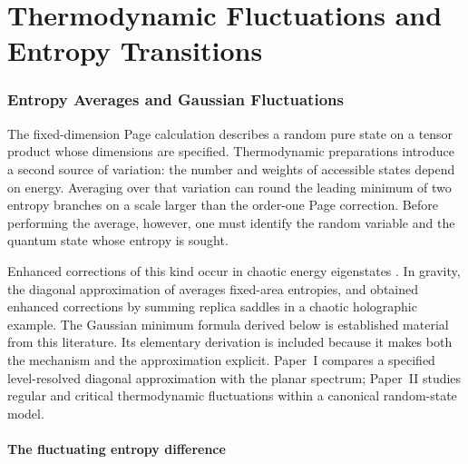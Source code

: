 \documentclass[11pt,letterpaper]{article}
\theoremstyle{plain}
\theoremstyle{definition}
\theoremstyle{remark}
\begin{document}
\part{Thermodynamic Fluctuations and Entropy Transitions}

\section{Entropy Averages and Gaussian Fluctuations}
\label{sec08:area_fluctuations}

The fixed-dimension Page calculation describes a random pure state on a tensor
product whose dimensions are specified. Thermodynamic preparations introduce a
second source of variation: the number and weights of accessible states depend
on energy. Averaging over that variation can round the leading minimum of two
entropy branches on a scale larger than the order-one Page correction. Before
performing the average, however, one must identify the random variable and the
quantum state whose entropy is sought.

Enhanced corrections of this kind occur in chaotic energy eigenstates
\citep{vidmarrigol2017,murthysrednicki2019}. In gravity, the diagonal
approximation of \citet{marolfwangwang2020} averages fixed-area entropies, and
\citet{dongwang2020} obtained enhanced corrections by summing replica saddles
in a chaotic holographic example. The Gaussian minimum formula derived below
is established material from this literature. Its elementary derivation is
included because it makes both the mechanism and the approximation explicit.
Paper~I \citep{wuebben2026paper1} compares a specified level-resolved diagonal
approximation with the planar spectrum; Paper~II
\citep{wuebben2026paper2} studies regular and critical thermodynamic
fluctuations within a canonical random-state model.

\subsection{The fluctuating entropy difference}
\label{subsec08:why_area_fluctuates}
\end{document}
